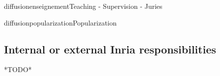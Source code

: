 \documentclass{ra2018}
\begin{document}
\begin{module}{diffusion}{enseignement}{Teaching - Supervision - Juries}

\end{module}

\begin{module}{diffusion}{popularization}{Popularization}



\subsection{Internal or external Inria responsibilities}
*TODO*


\end{module}
\end{document}
